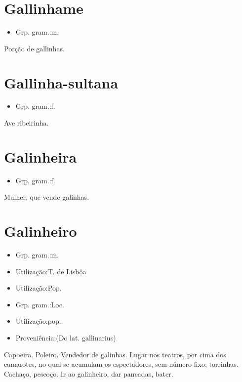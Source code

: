 \section{Gallinhame}
\begin{itemize}
\item {Grp. gram.:m.}
\end{itemize}
Porção de gallinhas.
\section{Gallinha-sultana}
\begin{itemize}
\item {Grp. gram.:f.}
\end{itemize}
Ave ribeirinha.
\section{Galinheira}
\begin{itemize}
\item {Grp. gram.:f.}
\end{itemize}
Mulher, que vende galinhas.
\section{Galinheiro}
\begin{itemize}
\item {Grp. gram.:m.}
\end{itemize}
\begin{itemize}
\item {Utilização:T. de Lisbôa}
\end{itemize}
\begin{itemize}
\item {Utilização:Pop.}
\end{itemize}
\begin{itemize}
\item {Grp. gram.:Loc.}
\end{itemize}
\begin{itemize}
\item {Utilização:pop.}
\end{itemize}
\begin{itemize}
\item {Proveniência:(Do lat. \textunderscore gallinarius\textunderscore )}
\end{itemize}
Capoeira.
Poleiro.
Vendedor de galinhas.
Lugar nos teatros, por cima dos camarotes, no qual se acumulam os espectadores, sem número fixo; torrinhas.
Cachaço, pescoço.
\textunderscore Ir ao galinheiro\textunderscore , dar pancadas, bater.
